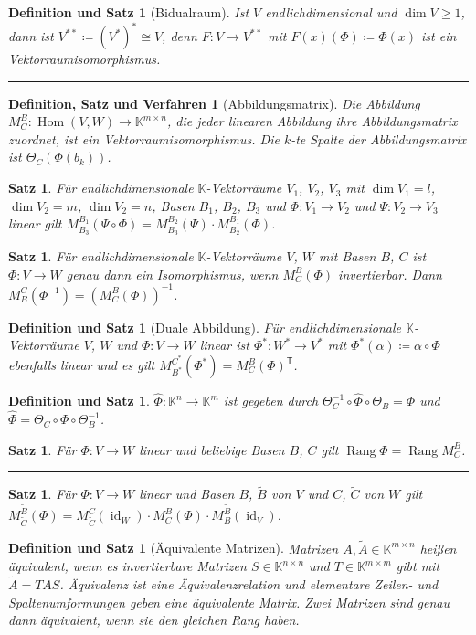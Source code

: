 \documentclass[a4paper]{article}
\newcounter{Sec}
\theoremstyle{marginbreak}
\newtheorem{satz}[definition]{Satz}
\newtheorem{defsatz}[definition]{Definition und Satz}
\newtheorem{defsatzver}[definition]{Definition, Satz und Verfahren}
\DeclareMathOperator{\Rang}{Rang}
\DeclareMathOperator{\Hom}{Hom}
\DeclareMathOperator{\id}{id}
\newcommand{\sep}{%
	\rule{\textwidth}{0.3pt}%
	\stepcounter{Sec}%
	}
\begin{document}
	\begin{defsatz}[Bidualraum]
		Ist $V$ endlichdimensional und $\dim V \geq 1$, dann ist $V^{**}\coloneqq(V^*)^*\cong V$,
		denn $F\colon V\to V^{**}$ mit $F(x)(\Phi)\coloneqq\Phi(x)$ ist ein Vektorraumisomorphismus.
	\end{defsatz}
	\sep
	\begin{defsatzver}[Abbildungsmatrix]
		Die Abbildung $M^B_C\colon\Hom(V, W)\to \mathbb{K}^{m\times n}$, die jeder
		linearen Abbildung ihre Abbildungsmatrix zuordnet, ist ein Vektorraumisomorphismus.
		Die $k$-te Spalte der Abbildungsmatrix ist $\Theta_C(\Phi(b_k))$.
	\end{defsatzver}
	\begin{satz}
		Für endlichdimensionale $\mathbb{K}$-Vektorräume $V_1$, $V_2$, $V_3$ mit $\dim V_1=l$, $\dim V_2=m$,
		$\dim V_2=n$, Basen $B_1$, $B_2$, $B_3$ und $\Phi\colon V_1\to V_2$ und
		$\Psi\colon V_2\to V_3$ linear gilt $M_{B_3}^{B_1}(\Psi\circ\Phi) = M_{B_3}^{B_2}(\Psi)\cdot M_{B_2}^{B_1}(\Phi)$.
	\end{satz}
	\begin{satz}
		Für endlichdimensionale $\mathbb{K}$-Vektorräume $V$, $W$ mit Basen $B$, $C$ ist
		$\Phi\colon V\to W$ genau dann ein Isomorphismus, wenn $M_C^B(\Phi)$ invertierbar.
		Dann $M_B^C(\Phi^{-1}) = (M_C^B(\Phi))^{-1}$.
	\end{satz}
	\begin{defsatz}[Duale Abbildung]
		Für endlichdimensionale $\mathbb{K}$-Vektorräume $V$, $W$ und $\Phi\colon V\to W$
		linear ist $\Phi^*\colon W^*\to V^*$ mit $\Phi^*(\alpha)\coloneqq\alpha\circ\Phi$
		ebenfalls linear und es gilt $M_{B^*}^{C^*}(\Phi^*) = M_C^B(\Phi)^{\mathsf{T}}$.
	\end{defsatz}
	\begin{defsatz}
		$\hat{\Phi}\colon\mathbb{K}^n\to\mathbb{K}^m$ ist gegeben durch
		$\Theta_C^{-1}\circ\hat{\Phi}\circ\Theta_B=\Phi$ und $\hat{\Phi}=\Theta_C\circ\Phi\circ\Theta_B^{-1}$.
	\end{defsatz}
	\begin{satz}
		Für $\Phi\colon V\to W$ linear und beliebige Basen $B$, $C$ gilt $\Rang\Phi=\Rang M_C^B$.
	\end{satz}
	\sep
	\begin{satz}
		Für $\Phi\colon V\to W$ linear und Basen $B$, $\tilde{B}$ von $V$ und
		$C$, $\tilde{C}$ von $W$ gilt $M_{\tilde{C}}^{\tilde{B}}(\Phi) = M_{\tilde{C}}^C(\id_W)\cdot M_C^B(\Phi)\cdot M_B^{\tilde{B}}(\id_V)$.
	\end{satz}
	\begin{defsatz}[Äquivalente Matrizen]
		Matrizen $A, \tilde{A} \in \mathbb{K}^{m\times n}$ heißen äquivalent, wenn es
		invertierbare Matrizen $S \in \mathbb{K}^{n\times n}$ und $T \in \mathbb{K}^{m\times m}$
		gibt mit $\tilde{A}=TAS$. Äquivalenz ist eine Äquivalenzrelation und elementare
		Zeilen- und Spaltenumformungen geben eine äquivalente Matrix. Zwei Matrizen sind
		genau dann äquivalent, wenn sie den gleichen Rang haben.
	\end{defsatz}
\end{document}
